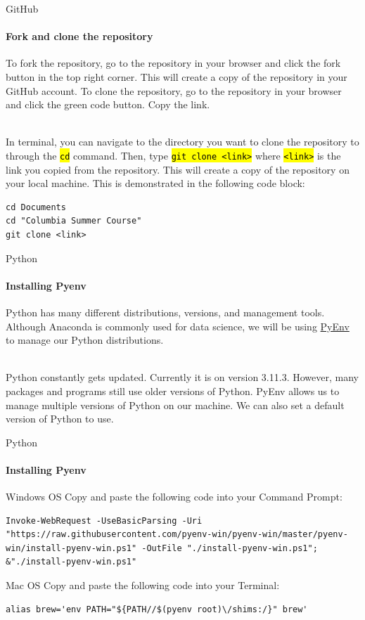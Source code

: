\documentclass[
    aspectratio=169, 
    usepdftitle=false, 
    xcolor={dvipsnames},
    hyperref={
        colorlinks,
        linkcolor=black,
        urlcolor=blue}
    ]{beamer}
\let\OldTexttt\texttt
\renewcommand{\texttt}[1]{\OldTexttt{\hl{#1}}}%
\begin{document}
\begin{frame}[fragile]{GitHub}
    \framesubtitle{Fork and clone the repository}

    To fork the repository, go to the repository in your browser and click the fork button in the top right corner. This will create a copy of the repository in your GitHub account. To clone the repository, go to the repository in your browser and click the green code button. Copy the link.\\~\

    In terminal, you can navigate to the directory you want to clone the repository to through the \texttt{cd} command. Then, type \texttt{git clone <link>} where \texttt{<link>} is the link you copied from the repository. This will create a copy of the repository on your local machine. This is demonstrated in the following code block:

    \begin{lstlisting}
cd Documents
cd "Columbia Summer Course"
git clone <link>
    \end{lstlisting}
\end{frame}

\begin{frame}{Python}
    \framesubtitle{Installing Pyenv}
    Python has many different distributions, versions, and management tools. Although Anaconda is commonly used for data science, we will be using \href{https://github.com/pyenv/pyenv}{PyEnv} to manage our Python distributions.\\~\

    Python constantly gets updated. Currently it is on version 3.11.3. However, many packages and programs still use older versions of Python. PyEnv allows us to manage multiple versions of Python on our machine. We can also set a default version of Python to use.\\
\end{frame}

\begin{frame}[fragile]{Python}
    \framesubtitle{Installing Pyenv}

    \begin{block}{Windows OS}
        Copy and paste the following code into your Command Prompt:
        \begin{lstlisting}
Invoke-WebRequest -UseBasicParsing -Uri "https://raw.githubusercontent.com/pyenv-win/pyenv-win/master/pyenv-win/install-pyenv-win.ps1" -OutFile "./install-pyenv-win.ps1"; &"./install-pyenv-win.ps1"
        \end{lstlisting}
    \end{block}

    \begin{block}{Mac OS}
        Copy and paste the following code into your Terminal:
        \begin{lstlisting}
alias brew='env PATH="${PATH//$(pyenv root)\/shims:/}" brew'
        \end{lstlisting}
    \end{block}

\end{frame}
\end{document}

